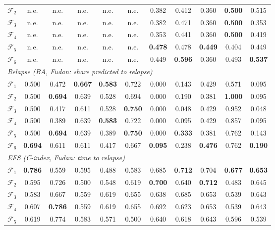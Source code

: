 \documentclass[pdflatex,sn-nature]{sn-jnl}
\begin{document}
\begin{appendices}
\begin{table}[p]
\begin{tabular}{@{}l ccccc ccccc@{}}
$\mathcal{F}_2$ & n.e. & n.e. & n.e. & n.e. & n.e. & 0.382 & 0.412 & 0.360 & \textbf{0.500} & 0.515 \\
$\mathcal{F}_3$ & n.e. & n.e. & n.e. & n.e. & n.e. & 0.382 & 0.471 & 0.360 & \textbf{0.500} & 0.353 \\
$\mathcal{F}_4$ & n.e. & n.e. & n.e. & n.e. & n.e. & 0.353 & 0.441 & 0.360 & \textbf{0.500} & 0.419 \\
$\mathcal{F}_5$ & n.e. & n.e. & n.e. & n.e. & n.e. & \textbf{0.478} & 0.478 & \textbf{0.449} & 0.404 & 0.449 \\
$\mathcal{F}_6$ & n.e. & n.e. & n.e. & n.e. & n.e. & 0.449 & \textbf{0.596} & 0.360 & 0.493 & \textbf{0.537} \\
\multicolumn{11}{l}{\textit{Relapse (BA, Fudan: share predicted to relapse)}} \\
$\mathcal{F}_1$ & 0.500 & 0.472 & \textbf{0.667} & \textbf{0.583} & 0.722 & 0.000 & 0.143 & 0.429 & 0.571 & 0.095 \\
$\mathcal{F}_2$ & 0.500 & \textbf{0.694} & 0.639 & 0.528 & 0.694 & 0.000 & 0.190 & 0.381 & \textbf{1.000} & 0.095 \\
$\mathcal{F}_3$ & 0.500 & 0.417 & 0.611 & 0.528 & \textbf{0.750} & 0.000 & 0.048 & 0.429 & 0.952 & 0.048 \\
$\mathcal{F}_4$ & 0.500 & 0.389 & 0.639 & \textbf{0.583} & 0.722 & 0.000 & 0.095 & 0.429 & 0.857 & 0.095 \\
$\mathcal{F}_5$ & 0.500 & \textbf{0.694} & 0.639 & 0.389 & \textbf{0.750} & 0.000 & \textbf{0.333} & 0.381 & 0.762 & 0.143 \\
$\mathcal{F}_6$ & \textbf{0.694} & 0.611 & 0.611 & 0.417 & 0.667 & \textbf{0.095} & 0.238 & \textbf{0.476} & 0.762 & \textbf{0.190} \\
\multicolumn{11}{l}{\textit{EFS (C-index, Fudan: time to relapse)}} \\
$\mathcal{F}_1$ & \textbf{0.786} & 0.559 & 0.595 & 0.488 & 0.583 & 0.685 & \textbf{0.712} & 0.704 & \textbf{0.677} & \textbf{0.653} \\
$\mathcal{F}_2$ & 0.595 & 0.726 & 0.500 & 0.548 & 0.619 & \textbf{0.700} & 0.640 & \textbf{0.712} & 0.483 & 0.645 \\
$\mathcal{F}_3$ & 0.583 & 0.667 & 0.559 & 0.619 & 0.655 & 0.638 & 0.685 & 0.653 & 0.539 & 0.643 \\
$\mathcal{F}_4$ & 0.607 & \textbf{0.786} & 0.559 & 0.619 & 0.655 & 0.692 & 0.623 & 0.653 & 0.539 & 0.643 \\
$\mathcal{F}_5$ & 0.619 & 0.774 & 0.583 & 0.571 & 0.500 & 0.640 & 0.618 & 0.643 & 0.596 & 0.539 \\

\end{tabular}
\end{table}
\end{appendices}
\end{document}
